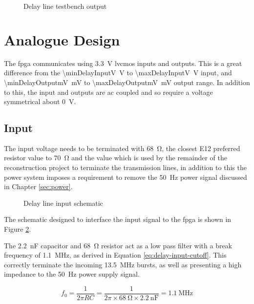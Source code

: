 \begin{figure}[ht]
	
	\centering
	\dummyfigure
	
	\caption{Delay line testbench output}
	
	\label{fig:delay-line-tb-output}
\end{figure}

\section{Analogue Design}

The \gls{fpga} communicates using \SI{3.3}{\volt} \gls{lvcmos} inputs and outputs. This is a great difference from the \SI{\minDelayInputV}{\volt} to \SI{\maxDelayInputV}{\volt} input, and \SI{\minDelayOutputmV}{\milli\volt} to \SI{\maxDelayOutputmV}{\milli\volt} output range. In addition to this, the input and outputs are \gls{ac} coupled and so require a voltage symmetrical about \SI{0}{\volt}.

\subsection{Input}

The input voltage needs to be terminated with \SI{68}{\ohm}, the closest E12 preferred resistor value to \SI{70}{\ohm} and the value which is used by the remainder of the reconstruction project to terminate the transmission lines, in addition to this the power system imposes a requirement to remove the \SI{50}{\hertz} power signal discussed in Chapter \ref{sec:power}.

\begin{figure}[ht]
	\centering
	\caption{Delay line input schematic }
	\label{fig:delay-line-input-sch}
\end{figure}

The schematic designed to interface the input signal to the \gls{fpga} is shown in Figure \ref{fig:delay-line-input-sch}.

The \SI{2.2}{\nano\farad} capacitor and \SI{68}{\ohm} resistor act as a low pass filter with a break frequency of \SI{1.1}{\mega\hertz}, as derived in Equation \ref{eq:delay-input-cutoff}. This correctly terminate the incoming \SI{13.5}{\mega\hertz} bursts, as well as presenting a high impedance to the \SI{50}{\hertz} power supply signal.

\begin{equation}
f_0 = \frac{1}{2\pi RC} = \frac{1}{2\pi \times \SI{68}{\ohm} \times \SI{2.2}{\nano\farad}} = \SI{1.1}{\mega\hertz} \label{eq:delay-input-cutoff}
\end{equation}


